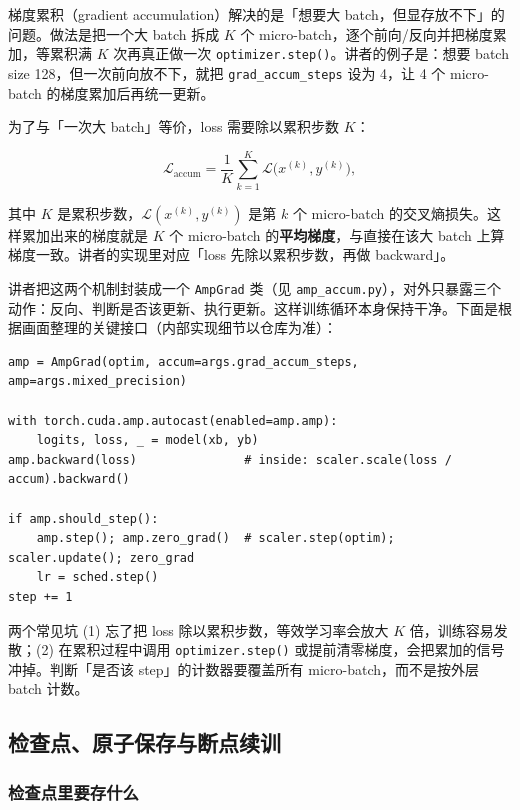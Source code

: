 梯度累积（gradient accumulation）解决的是「想要大 batch，但显存放不下」的问题。做法是把一个大 batch 拆成 $K$ 个 micro-batch，逐个前向/反向并把梯度累加，等累积满 $K$ 次再真正做一次 \texttt{optimizer.step()}。讲者的例子是：想要 batch size 128，但一次前向放不下，就把 \texttt{grad\_accum\_steps} 设为 4，让 4 个 micro-batch 的梯度累加后再统一更新。

为了与「一次大 batch」等价，loss 需要除以累积步数 $K$：

$$
\mathcal{L}_{\text{accum}}=\frac{1}{K}\sum_{k=1}^{K}\mathcal{L}\big(x^{(k)},y^{(k)}\big),
$$

其中 $K$ 是累积步数，$\mathcal{L}(x^{(k)},y^{(k)})$ 是第 $k$ 个 micro-batch 的交叉熵损失。这样累加出来的梯度就是 $K$ 个 micro-batch 的\textbf{平均梯度}，与直接在该大 batch 上算梯度一致。讲者的实现里对应「loss 先除以累积步数，再做 backward」。

讲者把这两个机制封装成一个 \texttt{AmpGrad} 类（见 \texttt{amp\_accum.py}），对外只暴露三个动作：反向、判断是否该更新、执行更新。这样训练循环本身保持干净。下面是根据画面整理的关键接口（内部实现细节以仓库为准）：

\begin{lstlisting}[caption={混合精度 + 梯度累积的关键调用（据视频 \texttt{train.py} 画面整理）：autocast 前向、缩放后反向，按累积步数决定何时真正更新。}]
amp = AmpGrad(optim, accum=args.grad_accum_steps, amp=args.mixed_precision)

with torch.cuda.amp.autocast(enabled=amp.amp):
    logits, loss, _ = model(xb, yb)
amp.backward(loss)               # inside: scaler.scale(loss / accum).backward()

if amp.should_step():
    amp.step(); amp.zero_grad()  # scaler.step(optim); scaler.update(); zero_grad
    lr = sched.step()
step += 1
\end{lstlisting}

\begin{warningbox}{两个常见坑}
(1) 忘了把 loss 除以累积步数，等效学习率会放大 $K$ 倍，训练容易发散；(2) 在累积过程中调用 \texttt{optimizer.step()} 或提前清零梯度，会把累加的信号冲掉。判断「是否该 step」的计数器要覆盖所有 micro-batch，而不是按外层 batch 计数。
\end{warningbox}

\subsection{检查点、原子保存与断点续训}

\subsubsection{检查点里要存什么}

